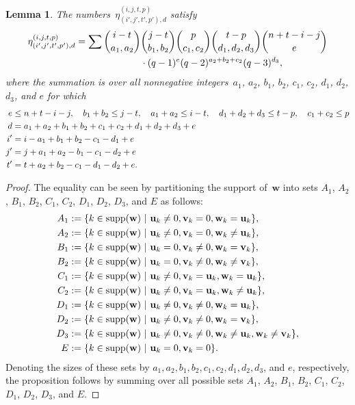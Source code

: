 \documentclass[10pt,a4paper]{article}
\newtheorem{lemma}[theorem]{Lemma}
\theoremstyle{definition}
\newcommand{\uu}{\mathbf{u}}
\newcommand{\vv}{\mathbf{v}}
\newcommand{\ww}{\mathbf{w}}
\DeclareMathOperator*{\supp}{supp}
\begin{document}
\begin{lemma}\label{lem:etaqary}
 The numbers~$\eta_{(i',j',t',p'),d}^{(i,j,t,p)}$ satisfy
\begin{align}
\eta_{(i',j',t',p'),d}^{(i,j,t,p)} =  \sum \binom{i-t}{a_1,a_2}&\binom{j-t}{b_1,b_2}\binom{p}{c_1,c_2}\binom{t-p}{d_1,d_2,d_3}\binom{n+t-i-j}{e}\notag\\&\cdot(q-1)^e (q-2)^{a_2+b_2+c_2}(q-3)^{d_3},
\end{align}
where the summation is over all nonnegative integers~$a_1$, $a_2$, $b_1$, $b_2$, $c_1$, $c_2$, $d_1$, $d_2$, $d_3$, and $e$ for which
\begin{align}
e &\leq n+t-i-j, \quad b_1+b_2 \leq j-t,\quad a_1+a_2 \leq i-t,\quad d_1+d_2+d_3 \leq t-p,\quad c_1+c_2 \leq p\\
d &= a_1 + a_2 +b_1 +b_2 +c_1 +c_2 +d_1 +d_2 +d_3 + e \notag \\
i'&= i - a_1 + b_1 + b_2 - c_1 - d_1 + e \notag \\
j'&= j + a_1 + a_2 - b_1 - c_1 - d_2 + e \notag \\
t' &= t +a_2 + b_2 -c_1 - d_1 - d_2 + e. \notag 
\end{align}
\end{lemma}
\begin{proof}
The equality can be seen by partitioning the support of~$\ww$ into sets $A_1$, $A_2$, $B_1$, $B_2$, $C_1$, $C_2$, $D_1$, $D_2$, $D_3$, and $E$ as follows:
\begin{align}
A_1 &:= \{k \in \supp(\ww) \,\,|\,\, \uu_k \neq 0, \vv_k = 0, \ww_k = \uu_k\}, \\
A_2 &:= \{k \in \supp(\ww) \,\,|\,\, \uu_k \neq 0, \vv_k = 0, \ww_k \neq \uu_k\}, \notag \\
B_1 &:= \{k \in \supp(\ww) \,\,|\,\, \uu_k = 0, \vv_k \neq 0, \ww_k = \vv_k\}, \notag \\
B_2 &:= \{k \in \supp(\ww) \,\,|\,\, \uu_k = 0, \vv_k \neq 0, \ww_k \neq \vv_k\}, \notag \\
C_1 &:= \{k \in \supp(\ww) \,\,|\,\, \uu_k \neq 0, \vv_k = \uu_k, \ww_k = \uu_k\}, \notag \\
C_2 &:= \{k \in \supp(\ww) \,\,|\,\, \uu_k \neq 0, \vv_k = \uu_k, \ww_k \neq \uu_k\}, \notag \\
D_1 &:= \{k \in \supp(\ww) \,\,|\,\, \uu_k \neq 0, \vv_k \neq 0, \ww_k = \uu_k\}, \notag \\
D_2 &:= \{k \in \supp(\ww) \,\,|\,\, \uu_k \neq 0, \vv_k \neq 0, \ww_k = \vv_k\}, \notag \\
D_3 &:= \{k \in \supp(\ww) \,\,|\,\, \uu_k \neq 0, \vv_k \neq 0, \ww_k \neq \uu_k, \ww_k \neq \vv_k\}, \notag \\
E &:= \{k \in \supp(\ww) \,\,|\,\, \uu_k = 0, \vv_k = 0\}. \notag
\end{align}
Denoting the sizes of these sets by $a_1, a_2, b_1, b_2, c_1, c_2, d_1, d_2, d_3$, and $e$, respectively, the proposition follows by summing over all possible sets $A_1$, $A_2$, $B_1$, $B_2$, $C_1$, $C_2$, $D_1$, $D_2$, $D_3$, and $E$.
\end{proof}
\end{document}
